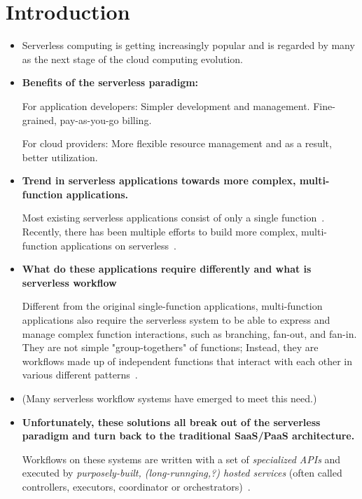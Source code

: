 \section{Introduction}

\begin{itemize}

  \item Serverless computing is getting increasingly popular and is regarded
by many as the next stage of the cloud computing evolution.

  \item \textbf{Benefits of the serverless paradigm:}

  For application developers: Simpler development and management.
  Fine-grained, pay-as-you-go billing.

  For cloud providers: More flexible resource management and as a result,
  better utilization.

  \item \textbf{Trend in serverless applications towards more complex,
  multi-function applications.}

  Most existing serverless applications consist of only a single
  function~\cite{shahrad-azure}. Recently, there has been multiple efforts to
  build more complex, multi-function applications on
  serverless~\cite{excamera, kappa, triggerflow, pywren, google-workflows,
  durable-functions, gg-atc}.

  \item \textbf{What do these applications require differently and what is
  serverless workflow}

  Different from the original single-function applications, multi-function
  applications also require the serverless system to be able to express and
  manage complex function interactions, such as branching, fan-out, and
  fan-in. They are not simple "group-togethers" of functions; Instead, they
  are workflows made up of independent functions that interact with each other
  in various different patterns~\cite{aws-step-functions, durable-functions,
  icpe-2020, ieee-fakhfakh, cloudburst}.


  \item (Many serverless workflow systems have emerged to meet this need.)


  \item \textbf{Unfortunately, these solutions all break out of the serverless
  paradigm and turn back to the traditional SaaS/PaaS architecture.}

  Workflows on these systems are written with a set of \emph{specialized APIs}
  and executed by \emph{purposely-built, (long-runnging,?) hosted services}
  (often called controllers, executors, coordinator or
  orchestrators)~\cite{gg-atc, excamera, kappa, triggerflow, pywren,
  durable-functions, aws-step-functions, google-cloud-composer,
  google-workflows}.


\end{itemize}

